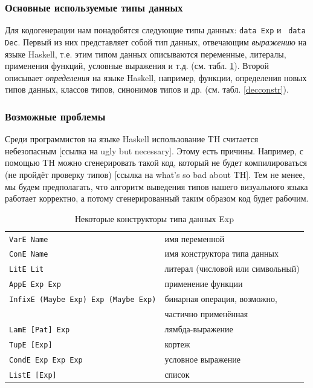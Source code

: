 	\subsubsection{Основные используемые типы данных} Для кодогенерации нам понадобятся следующие типы данных: \lstinline!data Exp! и \
	\lstinline!data Dec!. Первый из них представляет собой тип данных, отвечающим \textit{выражению} на языке Haskell, т.е. этим типом данных описываются переменные, литералы, применения функций, условные выражения и т.д. (см. табл. \ref{expconstr}). Второй описывает \textit{определения} на языке Haskell, например, функции, определения новых типов данных, классов типов, синонимов типов и др. (см. табл. \ref{decconstr}).
	
	\subsubsection{Возможные проблемы} Среди программистов на языке Haskell использование TH считается небезопасным [ссылка на ugly but necessary]. Этому есть причины. Например, с помощью TH можно сгенерировать такой код, который не будет компилироваться (не пройдёт проверку типов) [ссылка на what's so bad about TH]. Тем не менее, мы будем предполагать, что алгоритм выведения типов нашего визуального языка работает корректно, а потому сгенерированный таким образом код будет рабочим.
	
\begin{table}[h]
	\begin{center}
		\begin{tabular}{ll}
			{\lstinline!VarE Name!} & имя переменной \\
			{\lstinline!ConE Name!} & имя конструктора типа данных \\
			{\lstinline!LitE Lit!} & литерал (числовой или символьный) \\
			{\lstinline!AppE Exp Exp!} & применение функции \\
			{\lstinline!InfixE (Maybe Exp) Exp (Maybe Exp)!} & бинарная операция, возможно, \\ & частично применённая \\
			{\lstinline!LamE [Pat] Exp!} & лямбда-выражение \\
			{\lstinline!TupE [Exp]!} & кортеж \\
			{\lstinline!CondE Exp Exp Exp!} & условное выражение \\
			{\lstinline!ListE [Exp]!} & список \\
		\end{tabular}
	\end{center}
\caption{Некоторые конструкторы типа данных Exp}
\label{expconstr}
\end{table}

